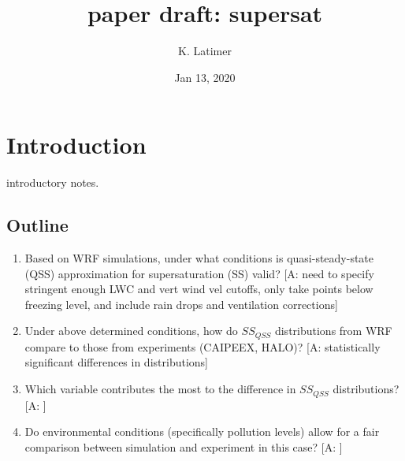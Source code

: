 \documentclass{article}
\title{paper draft: supersat}
\author{K. Latimer}
\date{Jan 13, 2020}
\begin{document}
\maketitle


\section{Introduction}
introductory notes.

\subsection{Outline}
	\begin{enumerate}
		\item Based on WRF simulations, under what conditions is quasi-steady-state (QSS) approximation for supersaturation (SS) valid? [A: need to specify stringent enough LWC and vert wind vel cutoffs, only take points below freezing level, and include rain drops and ventilation corrections]
		\item Under above determined conditions, how do $SS_{QSS}$ distributions from WRF compare to those from experiments (CAIPEEX, HALO)? [A: statistically significant differences in distributions]
		\item Which variable contributes the most to the difference in $SS_{QSS}$ distributions? [A: ]
		\item Do environmental conditions (specifically pollution levels) allow for a fair comparison between simulation and experiment in this case? [A: ]
	\end{enumerate}
\end{document}
